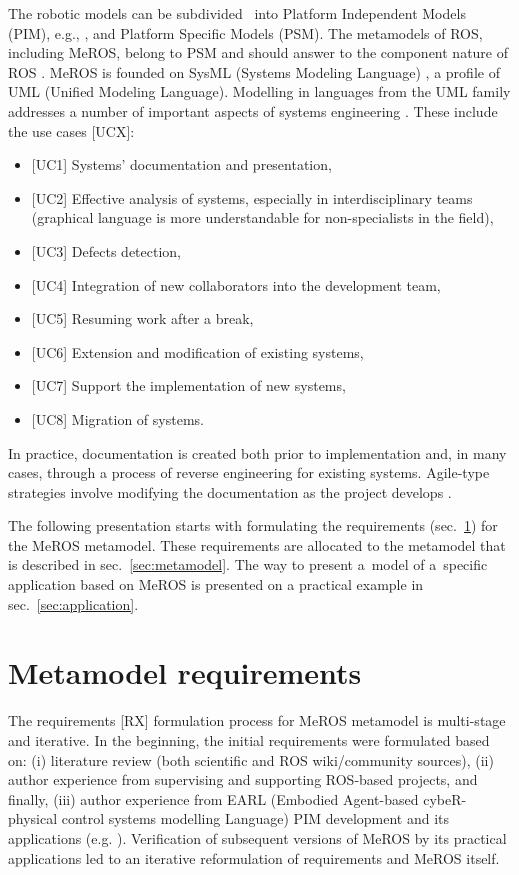 \documentclass[11pt,oneside,a4paper]{article}
\begin{document}
	The robotic models can be subdivided~\cite{de2021survey} into Platform Independent Models (PIM), e.g., \cite{zielinski2017variable,zielinski2010motion,tasker2020,earl2020}, and Platform Specific Models (PSM). The metamodels of ROS, including MeROS, belong to PSM and should answer to the component nature of ROS \cite{Figat:2022:RAS,wenger2016model}.
	 MeROS is founded on SysML (Systems Modeling Language) \cite{omg-sysml16,Friedenthal:2015}, a profile of UML (Unified Modeling Language). Modelling in languages from the UML family addresses a number of important aspects of systems engineering \cite{chaudron2012effective}. These include the use cases [UCX]:
	\begin{itemize}
		\item $[$UC1] Systems' documentation and presentation,
		\item $[$UC2] Effective analysis of systems, especially in interdisciplinary teams (graphical language is more understandable for non-specialists in the field), 
		\item $[$UC3] Defects detection,
		\item $[$UC4] Integration of new collaborators into the development team,
		\item $[$UC5] Resuming work after a break,
		\item $[$UC6] Extension and modification of existing systems,
		\item $[$UC7] Support the implementation of new systems,
		\item $[$UC8] Migration of systems.   
	\end{itemize}
	
	In practice, documentation is created both prior to implementation and, in many cases, through a process of reverse  engineering \cite{canfora2007new} for existing systems. Agile-type strategies involve modifying the documentation as the project develops \cite{habib2021systematic}.
			
	The following presentation starts with formulating the requirements (sec.~\ref{sec:requirements}) for the MeROS metamodel. These requirements are allocated to the metamodel that is described in sec.~\ref{sec:metamodel}. The way to present a~model of a~specific application based on MeROS is presented on a practical example in sec.~\ref{sec:application}.
	
	
\section{Metamodel requirements}
\label{sec:requirements}
	The requirements [RX] formulation process for MeROS metamodel is multi-stage and iterative. In the beginning, the initial requirements were formulated based on: (i) literature review (both scientific and ROS wiki/community sources), (ii) author experience from supervising and supporting ROS-based projects, and finally, (iii) author experience from EARL (Embodied Agent-based cybeR-physical control systems modelling Language) \cite{earl2020} PIM development and its applications (e.g. \cite{tasker2020,karwowski2021hubero,en14206693-grav-comp}). Verification of subsequent versions of MeROS by its practical applications led to an iterative reformulation of requirements and MeROS itself. 
	
\end{document}
